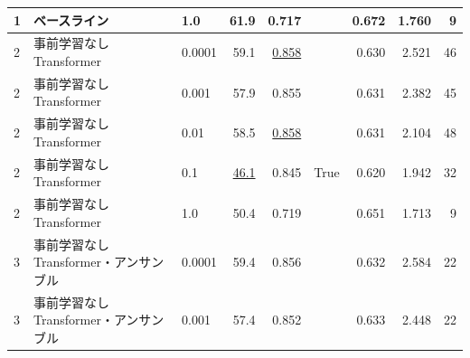 \documentclass[12pt]{jarticle}
\numberwithin{equation}{section}    %
\numberwithin{figure}{section}      %
\numberwithin{table}{section}      %
\begin{document}
\begin{table}[bt]
\begin{center}
{\begin{tabular}{|l|l|l|rrc|rrr|}
                1                        & ベースライン                   & 1.0                                      & 61.9                         & 0.717                     &                            & 0.672                         & 1.760                             & 9                          \\
                \hline
                2                        & 事前学習なしTransformer        & 0.0001                                   & 59.1                         & \underline{0.858}         &                            & 0.630                         & 2.521                             & 46                         \\
                2                        & 事前学習なしTransformer        & 0.001                                    & 57.9                         & 0.855                     &                            & 0.631                         & 2.382                             & 45                         \\
                2                        & 事前学習なしTransformer        & 0.01                                     & 58.5                         & \underline{0.858}         &                            & 0.631                         & 2.104                             & 48                         \\
                2                        & 事前学習なしTransformer        & 0.1                                      & \underline{46.1}             & 0.845                     & True                       & 0.620                         & 1.942                             & 32                         \\
                2                        & 事前学習なしTransformer        & 1.0                                      & 50.4                         & 0.719                     &                            & 0.651                         & 1.713                             & 9                          \\
                \hline
                3                        & 事前学習なしTransformer・アンサンブル & 0.0001                                   & 59.4                         & 0.856                     &                            & 0.632                         & 2.584                             & 22                         \\
                3                        & 事前学習なしTransformer・アンサンブル & 0.001                                    & 57.4                         & 0.852                     &                            & 0.633                         & 2.448                             & 22                         \\

\end{tabular}}
\end{center}
\end{table}
\end{document}
